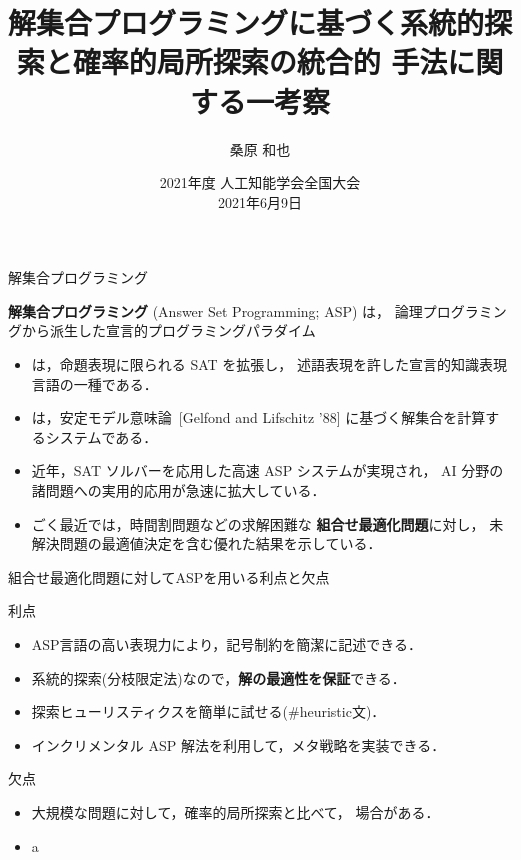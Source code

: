 \documentclass[11pt,dvipdfmx]{beamer}
\title{解集合プログラミングに基づく系統的探索と確率的局所探索の統合的
  手法に関する一考察}
\author{桑原 和也}
\institute{名古屋大学大学院情報学研究科}
\date{2021年度 人工知能学会全国大会\\2021年6月9日}
\begin{document}
\maketitle
\begin{frame}{解集合プログラミング}
  \begin{alertblock}{}\centering
    \alert{\bf 解集合プログラミング} (Answer Set Programming; ASP) は，
    論理プログラミングから派生した宣言的プログラミングパラダイム
  \end{alertblock}
  \bigskip
  \begin{itemize}
  \item {}は，命題表現に限られる SAT を拡張し，
    述語表現を許した宣言的知識表現言語の一種である．
  \item {}は，安定モデル意味論~[Gelfond and Lifschitz '88]
    に基づく解集合を計算するシステムである．
  \item 近年，SAT ソルバーを応用した高速 ASP システムが実現され，
    AI 分野の諸問題への実用的応用が急速に拡大している．
  \item ごく最近では，時間割問題などの求解困難な
    \alert{\bf 組合せ最適化問題}に対し，
    未解決問題の最適値決定を含む優れた結果を示している．
  \end{itemize}
\end{frame}
\begin{frame}{組合せ最適化問題に対してASPを用いる利点と欠点}
  \begin{alertblock}{利点}
    \begin{itemize}
    \item ASP言語の高い表現力により，記号制約を簡潔に記述できる．
    \item 系統的探索(分枝限定法)なので，\alert{\bf 解の最適性を保証}できる．
    \item 探索ヒューリスティクスを簡単に試せる(\textsf{\#heuristic}文)．
    \item インクリメンタル ASP 解法を利用して，メタ戦略を実装できる．
    \end{itemize}
  \end{alertblock}
  \bigskip
  \begin{block}{欠点}
    \begin{itemize}
    \item 大規模な問題に対して，確率的局所探索と比べて，
      場合がある．
    \item a
    \end{itemize}
  \end{block}
\end{frame}
\end{document}
